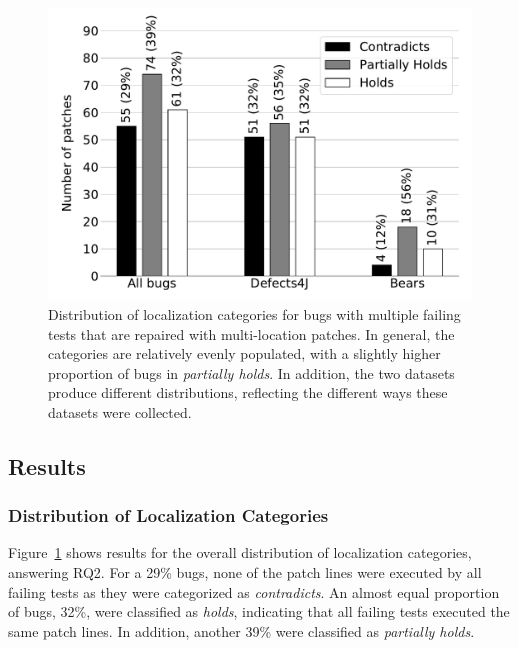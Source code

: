 \documentclass[10pt, conference]{IEEEtran}
\begin{document}
\begin{figure}
	\includegraphics[width=\linewidth]{img/coverage_hist_all.pdf}
	\caption{Distribution of localization categories for bugs with multiple failing
      tests that are repaired with multi-location patches. In general, the categories are relatively 
      evenly populated, with a slightly higher proportion of bugs in \emph{partially holds}. In 
      addition, the two datasets produce different distributions, reflecting the different 
      ways these datasets were collected.}
	\label{fig:coverage-all}
\end{figure}

\subsection{Results}

\subsubsection{Distribution of Localization Categories} \label{sec:cov_patterns}

Figure~\ref{fig:coverage-all} shows results for the overall distribution of localization categories, 
answering RQ2. 
For a 29\% bugs, none of the patch lines were executed by all failing tests as they were 
categorized as \emph{contradicts}.  An almost equal proportion of bugs, 32\%, were classified 
as 
\emph{holds}, indicating that all failing tests executed the same patch lines.
In addition, another 39\% were classified as \emph{partially holds}.
\end{document}
